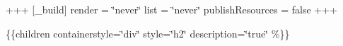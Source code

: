 +++ \mbox{[}\+\_\+build\mbox{]} render = \char`\"{}never\char`\"{} list = \char`\"{}never\char`\"{} publish\+Resources = false +++

\{\{children containerstyle=\char`\"{}div\char`\"{} style=\char`\"{}h2\char`\"{} description=\char`\"{}true\char`\"{} \%\}\} 